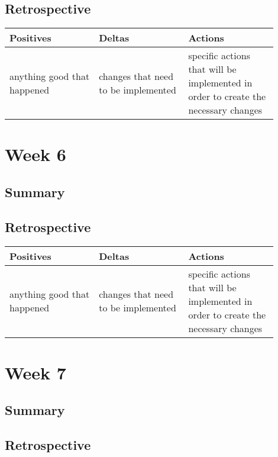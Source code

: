 \documentclass[letterpaper,10pt,serif,draftclsnofoot,onecolumn,compsoc,titlepage]{IEEEtran}
\begin{document}
\subsection{Retrospective}

\begin{tabular}{|p{0.3\linewidth}|p{0.3\linewidth}|p{0.3\linewidth}|}
   \hline
   \textbf{Positives} & \textbf{Deltas} & \textbf{Actions}\\ 
   \hline
   anything good that happened 
   & 
   changes that need to be implemented 
   & 
   specific actions that will be implemented in order to create the necessary 
   changes \\
   \hline
\end{tabular}

\section{Week 6}

\subsection{Summary}


\subsection{Retrospective}


\begin{tabular}{|p{0.3\linewidth}|p{0.3\linewidth}|p{0.3\linewidth}|}
   \hline
   \textbf{Positives} & \textbf{Deltas} & \textbf{Actions}\\ 
   \hline
   anything good that happened & changes that need to be implemented & specific actions that will be implemented in order to create the necessary changes \\
   \hline
\end{tabular}

\section{Week 7}

\subsection{Summary}


\subsection{Retrospective}
\end{document}
